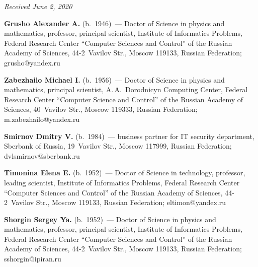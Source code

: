 \vspace*{-6pt}

\hfill{\small\textit{Received June 2, 2020}}



\Contr

\noindent
\textbf{Grusho Alexander A.} (b.\ 1946)~--- Doctor of Science in physics and mathematics, professor, 
principal scientist, Institute of Informatics Problems, Federal Research Center ``Computer Sciences 
and Control'' of the Russian Academy of Sciences, 44-2~Vavilov Str., Moscow 119133, Russian 
Federation;  \mbox{grusho@yandex.ru}

\vspace*{3pt}

\noindent
\textbf{Zabezhailo Michael I.} (b.\ 1956)~--- Doctor of Science in physics and mathematics, principal 
scientist, A.\,A.~Dorodnicyn Computing Center, Federal Research Center ``Computer Science and 
Control'' of the Russian Academy of Sciences, 40~Vavilov Str., Moscow 119333, Russian Federation; 
\mbox{m.zabezhailo@yandex.ru}

\vspace*{3pt}

\noindent
\textbf{Smirnov Dmitry V.} (b.\ 1984)~--- business partner
 for IT security department, Sberbank of 
Russia, 19~Vavilov Str., Moscow 117999, Russian Federation; \mbox{dvlsmirnov@sberbank.ru}

\vspace*{3pt}

\noindent
\textbf{Timonina Elena E.} (b.\ 1952)~--- Doctor of Science in technology, professor, leading scientist, 
Institute of Informatics Problems, Federal Research Center ``Computer Sciences and Control'' of the 
Russian Academy of Sciences, 44-2~Vavilov Str., Moscow 119133, Russian Federation; 
\mbox{eltimon@yandex.ru}

\vspace*{3pt}

\noindent
\textbf{Shorgin Sergey Ya.} (b.\ 1952)~--- Doctor of Science in physics and mathematics, professor, 
principal scientist, Institute of Informatics Problems, Federal Research Center ``Computer Sciences 
and Control'' of the Russian Academy of Sciences, 44-2~Vavilov Str., Moscow 119133, Russian 
Federation; \mbox{sshorgin@ipiran.ru}





\label{end\stat}

\renewcommand{\bibname}{\protect\rm Литература} 
